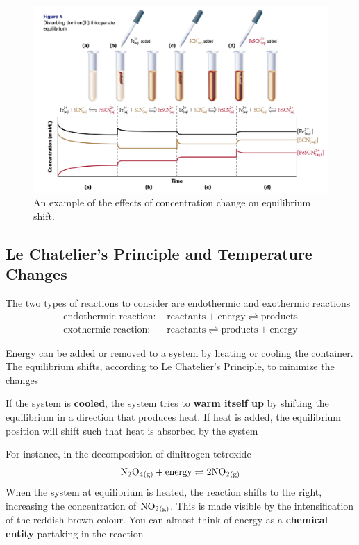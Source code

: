 \begin{figure}[ht!]
    \centering
    \includegraphics[width= \textwidth]{../figures/iron-3-thiocyanate-equilibrium-shift.png}
    \caption{An example of the effects of concentration change on equilibrium shift.}
\end{figure}

\subsection{Le Chatelier's Principle and Temperature Changes}
The two types of reactions to consider are endothermic and exothermic reactions
\begin{align*}
    \text{endothermic reaction: }&\text{reactants}+\text{energy}\rightleftharpoons \text{products}\\
    \text{exothermic reaction: }&\text{reactants}\rightleftharpoons \text{products}+\text{energy}
\end{align*}
\begin{bulleted-list}
    \item Energy can be added or removed to a system by heating or cooling the container. The
        equilibrium shifts, according to Le Chatelier's Principle, to minimize the changes
    \item If the system is \textbf{cooled}, the system tries to \textbf{warm itself up} by shifting
        the equilibrium in a direction that produces heat. If heat is added, the equilibrium
        position will shift such that heat is absorbed by the system
    \item For instance, in the decomposition of dinitrogen tetroxide
        \[
            \ch{N2O4_{(g)}}+\text{energy}\rightleftharpoons2 \ch{NO2_{(g)}}
        \]
        When the system at equilibrium is heated, the reaction shifts to the right, increasing
        the concentration of $\ch{NO2_{(g)}}$. This is made visible by the intensification of
        the reddish-brown colour. You can almost think of energy as a \textbf{chemical entity}
        partaking in the reaction
\end{bulleted-list}

